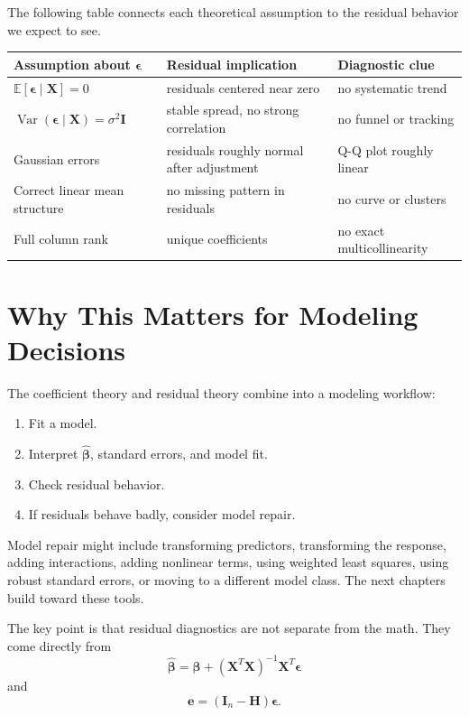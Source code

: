 The following table connects each theoretical assumption to the residual behavior we expect to see.

\begin{center}
\begin{tabular}{p{}p{}p{}}
\toprule
Assumption about \(\boldsymbol{\epsilon}\) & Residual implication & Diagnostic clue \\
\midrule
\(\mathbb{E}[\boldsymbol{\epsilon}\mid\mathbf{X}]=0\) & residuals centered near zero & no systematic trend \\
\(\operatorname{Var}(\boldsymbol{\epsilon}\mid\mathbf{X})=\sigma^2\mathbf{I}\) & stable spread, no strong correlation & no funnel or tracking \\
Gaussian errors & residuals roughly normal after adjustment & Q-Q plot roughly linear \\
Correct linear mean structure & no missing pattern in residuals & no curve or clusters \\
Full column rank & unique coefficients & no exact multicollinearity \\
\bottomrule
\end{tabular}
\end{center}

\section{Why This Matters for Modeling Decisions}

The coefficient theory and residual theory combine into a modeling workflow:
\begin{enumerate}
  \item Fit a model.
  \item Interpret \(\widehat{\boldsymbol{\beta}}\), standard errors, and model fit.
  \item Check residual behavior.
  \item If residuals behave badly, consider model repair.
\end{enumerate}

Model repair might include transforming predictors, transforming the response, adding interactions, adding nonlinear terms, using weighted least squares, using robust standard errors, or moving to a different model class.  The next chapters build toward these tools.

The key point is that residual diagnostics are not separate from the math.  They come directly from
\begin{equation}
  \widehat{\boldsymbol{\beta}}
  =\boldsymbol{\beta}+(\mathbf{X}^T\mathbf{X})^{-1}\mathbf{X}^T\boldsymbol{\epsilon}
\end{equation}
and
\begin{equation}
  \mathbf{e}=(\mathbf{I}_n-\mathbf{H})\boldsymbol{\epsilon}.
\end{equation}


